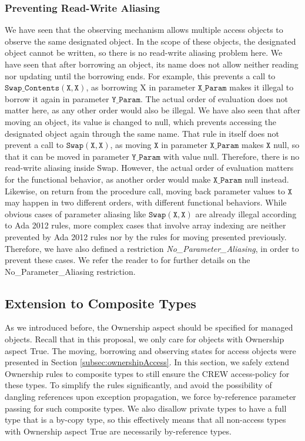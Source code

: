 \documentclass{llncs}
\newcommand\var[1]{\ensuremath{\mathtt{#1}}}
\begin{document}
\subsubsection{Preventing Read-Write Aliasing}
\label{sec:noaliasing}
We have seen that the observing mechanism allows multiple access objects to observe the same designated object. In the scope of these objects, the designated object
cannot be written, so there is no read-write aliasing problem here.
We have seen that after borrowing an object, its name does not allow neither reading nor updating until the borrowing ends. For example, this prevents a call to \var{Swap\_Contents (X, X)},
as borrowing X in parameter \var{X\_Param} makes it illegal to borrow it again in parameter \var{Y\_Param}. The actual order of evaluation does not matter here, as any other order would also be illegal.
We have also seen that after moving an object, its value is changed to null, which prevents accessing the designated object again through the same name.
That rule in itself does not prevent a call to \var{Swap(X, X)}, as moving \var{X} in parameter \var{X\_Param} makes \var{X} null, so that it can be moved in parameter \var{Y\_Param} with value null.
Therefore, there is no read-write aliasing inside Swap. However, the actual order of evaluation matters for the functional behavior, as another order would make \var{X\_Param} null
instead. Likewise, on return from the procedure call, moving back parameter values to \var{X} may happen in two different orders, with different functional behaviors.
While obvious cases of parameter aliasing like \var{Swap(X,X)} are already illegal according to Ada 2012 rules, more complex cases that involve array indexing are neither
prevented by Ada 2012 rules nor by the rules for moving presented previously. Therefore, we have also defined a restriction \textit{No\_Parameter\_Aliasing},
in order to prevent these cases. We refer the reader to \cite{AI2017} for further details on the No\_Parameter\_Aliasing restriction.


\subsection{Extension to Composite Types} 
\label{subsec:ownershipComposite}

As we introduced before, the Ownership aspect should be specified for managed objects. Recall that in this proposal, we only care for objects with Ownership aspect True.
The moving, borrowing and observing states for access objects were presented in Section \ref{subsec:ownershipAccess}. In this section, we safely extend Ownership rules to
composite types to still ensure the CREW access-policy for these types. To simplify the rules significantly, and avoid the possibility of dangling references upon exception
propagation, we force by-reference parameter passing for such composite types.  We also disallow private types to have a full type that is a by-copy type, so this effectively
means that all non-access types with Ownership aspect True are necessarily by-reference types. 
\end{document}
